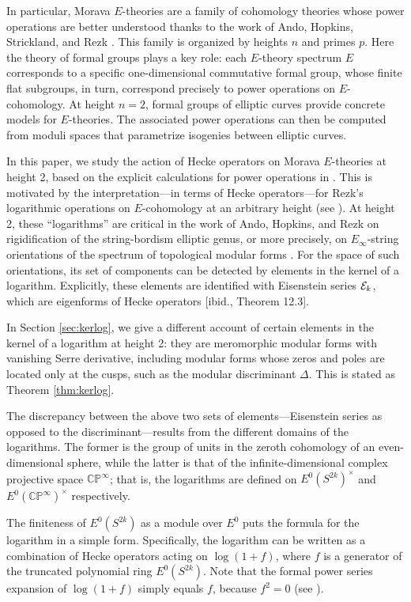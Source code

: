 \documentclass{gtpart}
\theoremstyle{definition}
\theoremstyle{remark}
\newcommand{\mb}[1]{\mathbb{#1}}
\newcommand{\CE}{{\cal E}}
\newcommand{\BC}{{\mb C}}
\newcommand{\BP}{{\mb P}}
\renewcommand{\D}{\Delta}
\renewcommand{\=}{\approx}
\renewcommand{\-}{\sim}
\numberwithin{equation}{section}
\numberwithin{thm}{section}
\begin{document}
In particular, Morava $E$-theories are a family 
of cohomology theories whose power operations 
are better understood thanks to the work of Ando, Hopkins, Strickland, and Rezk \cite{AHS04,cong,h2}.  
This family is organized by heights $n$ and primes $p$.  
Here the theory of formal groups plays a key 
role: each $E$-theory spectrum $E$ corresponds to a specific 
one-dimensional commutative formal group, whose finite 
flat subgroups, in turn, correspond precisely to power operations on $E$-cohomology.  At 
height $n = 2$, formal groups of elliptic curves provide concrete models for 
$E$-theories.  The associated power operations can then be computed from moduli spaces that 
parametrize isogenies between elliptic curves.  

In this paper, we study the action of Hecke operators on Morava $E$-theories 
at height 2, based on the explicit calculations for power operations in 
\cite{h2p2,p3}.  This is motivated by the interpretation---in terms of Hecke operators---for 
Rezk's logarithmic operations on $E$-cohomology at an arbitrary height (see 
\cite[1.12]{log}).  At height 2, these 
``logarithms'' are critical in the work of Ando, Hopkins, and Rezk on rigidification of 
the string-bordism elliptic genus, or more precisely, on $E_\infty$-string orientations 
of the spectrum of topological modular forms \cite{koandtmf}.  
For the space of such orientations, its set of components 
can be detected by elements in the kernel of a logarithm.  
Explicitly, these elements are identified with Eisenstein series $\CE_k$, which are 
eigenforms of Hecke operators [ibid., Theorem 12.3].  

In Section \ref{sec:kerlog}, we give a different account of certain elements in the kernel of a 
logarithm at height 2: they are meromorphic modular forms with vanishing Serre derivative, including 
modular forms whose zeros and poles are located only at the cusps, such as the modular discriminant $\D$.  
This is stated as Theorem \ref{thm:kerlog}.  

The discrepancy between the above two sets of elements---Eisenstein series as opposed to the 
discriminant---results from the different domains of the logarithms.  
The former is the group of units in the zeroth cohomology of an even-dimensional sphere, 
while the latter is that of the infinite-dimensional complex projective space 
$\BC\BP^\infty$; that is, the logarithms are defined on $E^0(S^{2 k})^\times$ and $E^0(\BC\BP^\infty)^\times$ respectively.  

The finiteness of $E^0(S^{2 k})$ as a module over $E^0$ puts the formula for the logarithm in a simple form.  
Specifically, the logarithm can be written as a combination of Hecke operators acting on $\log (1 + f)$, 
where $f$ is a generator of the truncated polynomial ring $E^0(S^{2 k})$.  Note that the formal power series 
expansion of $\log (1 + f)$ simply equals $f$, because $f^2 = 0$ (see \cite[Proposition 4.8 and Example 4.9]{koandtmf}).  
\end{document}
